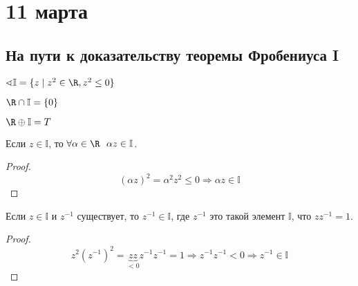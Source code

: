 \chapter{11 марта}

\section{На пути к доказательству теоремы Фробениуса I}

\(\sphericalangle \mathbb{I} = \{z \mid z^2 \in \R, z^2 \leq 0\}\)

\begin{remark}
	\(\R \cap \mathbb{I} = \{0\}\)
\end{remark}

\begin{theorem}
	\(\R \oplus \mathbb{I} = T\)
\end{theorem}

\begin{lemma}
	Если \(z \in \mathbb{I}\), то \(\forall \alpha \in \R \ \ \alpha z \in \mathbb{I}\).
\end{lemma}
\begin{proof}
	\[(\alpha z)^2 = \alpha^2 z^2 \leq 0 \Rightarrow \alpha z \in \mathbb{I}\]
\end{proof}

\begin{lemma}
	Если \(z \in \mathbb{I}\) и \(z^{-1}\) существует, то \(z^{-1} \in \mathbb{I}\), где \(z^{-1}\) это такой элемент \(\mathbb{I}\), что \(zz^{-1} = 1\).
\end{lemma}
\begin{proof}
	\[z^2 (z^{-1})^2 = \underbrace{zz}_{< 0} z^{-1}z^{-1} = 1 \Rightarrow z^{-1}z^{-1} < 0 \Rightarrow z^{-1} \in \mathbb{I}\]
\end{proof}

